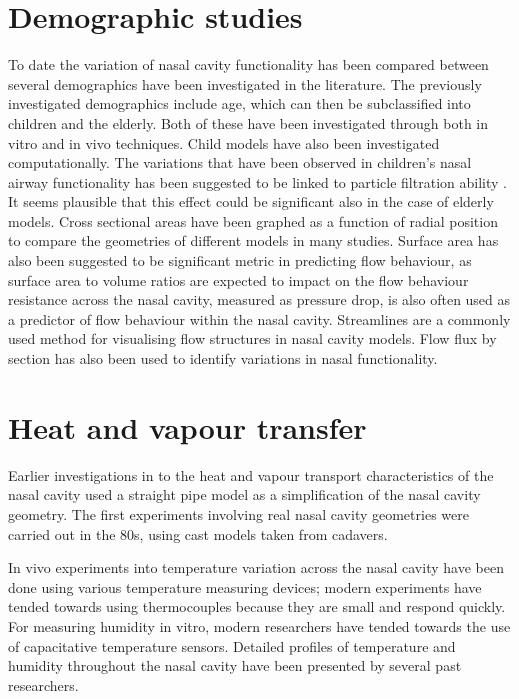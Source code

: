 \section{Demographic studies}
To date the variation of nasal cavity functionality has been compared between several demographics have been investigated in the literature. The previously investigated demographics include  age\cite{Xi2012}, which can then be subclassified into children\cite{Xi2012} and the elderly\cite{Lindemann2008}. Both of these have been investigated through both in vitro\cite{Weinhold2004} and in vivo\cite{Kalmovich2005, Edelstein1996, WhanKim2007, Lindemann2008} techniques. Child models have also been investigated computationally\cite{Xi2012}. The variations that have been observed in children's nasal airway functionality has been suggested to be linked to particle filtration ability \cite{Xi2012}. It seems plausible that this effect could be significant also in the case of elderly models. Cross sectional areas have been graphed as a function of radial position to compare the geometries of different models in many studies\cite{Xi2012, Zhu2011, Lindemann2008, Garcia2007}. Surface area has also been suggested to be significant metric in predicting flow behaviour, as surface area to volume ratios are expected to impact on the flow behaviour\cite{Xi2012, Garcia2007} resistance across the nasal cavity, measured as pressure drop, is also often used as a predictor of flow behaviour within the nasal cavity\cite{Edelstein1996, Lindemann2008, WhanKim2007}. Streamlines are a commonly used method for visualising flow structures in nasal cavity models\cite{Xi2012, Garcia2007, Zhu2011}. Flow flux by section has also been used to identify variations in nasal functionality\cite{Zhu2011}. 


\section{Heat and vapour transfer}

Earlier investigations in to the heat and vapour transport characteristics of the nasal cavity used a straight pipe model as a simplification of the nasal cavity geometry\cite{Ingelstedt1961}. The first experiments involving real nasal cavity geometries were carried out in the 80s, using cast models taken from cadavers\cite{Nuckols1983}.

In vivo experiments into temperature variation across the nasal cavity have been done using various temperature measuring devices; modern experiments have tended towards using thermocouples because they are small and respond quickly\cite{Elad2008}. For measuring humidity in vitro, modern researchers have tended towards the use of capacitative temperature sensors\cite{Keck2000}. Detailed profiles of temperature and humidity throughout the nasal cavity have been presented by several past researchers\cite{Keck2000}.

